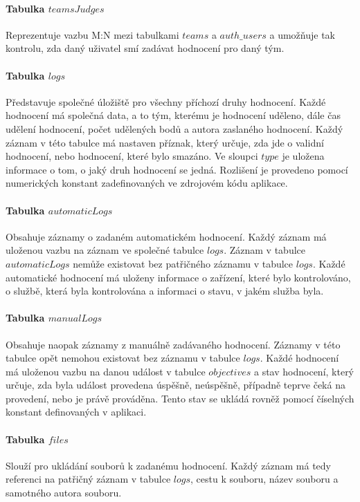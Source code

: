 \documentclass[
  digital,
  twoside,
  table, 
  nolof, 
  nolot
]{fithesis3}
\begin{document}
\paragraph{Tabulka $teamsJudges$} Reprezentuje vazbu M:N mezi tabulkami $teams$ a $auth\_users$ a umožňuje tak kontrolu, zda daný uživatel smí zadávat hodnocení pro daný tým. 

\paragraph{Tabulka $logs$} Představuje společné úložiště pro všechny příchozí druhy hodnocení. Každé hodnocení má společná data, a to tým, kterému je hodnocení uděleno, dále čas udělení hodnocení, počet udělených bodů a autora zaslaného hodnocení. Každý záznam v této tabulce má nastaven příznak, který určuje, zda jde o validní hodnocení, nebo hodnocení, které bylo smazáno. Ve sloupci $type$ je uložena informace o tom, o jaký druh hodnocení se jedná. Rozlišení je provedeno pomocí numerických konstant zadefinovaných ve zdrojovém kódu aplikace.

\paragraph{Tabulka $automaticLogs$} Obsahuje záznamy o zadaném automatickém hodnocení. Každý záznam má uloženou vazbu na záznam ve společné tabulce $logs$. Záznam v tabulce $automaticLogs$ nemůže existovat bez patřičného záznamu v tabulce $logs$. Každé automatické hodnocení má uloženy informace o zařízení, které bylo kontrolováno, o službě, která byla kontrolována a informaci o stavu, v jakém služba byla.

\paragraph{Tabulka $manualLogs$} Obsahuje naopak záznamy z manuálně zadávaného hodnocení. Záznamy v této tabulce opět nemohou existovat bez záznamu v tabulce $logs$. Každé hodnocení má uloženou vazbu na danou událost v tabulce $objectives$ a stav hodnocení, který určuje, zda byla událost provedena úspěšně, neúspěšně, případně  teprve čeká na provedení, nebo je právě prováděna. Tento stav se ukládá rovněž pomocí číselných konstant definovaných v aplikaci.

\paragraph{Tabulka $files$} Slouží pro ukládání souborů k zadanému hodnocení. Každý záznam má tedy referenci na patřičný záznam v tabulce $logs$, cestu k souboru, název souboru a samotného autora souboru.
\end{document}
